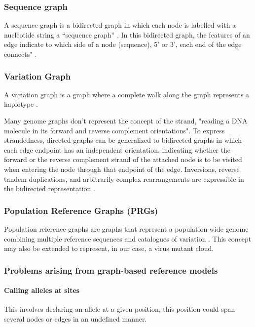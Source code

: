 \documentclass[10pt, a4paper]{article}
\begin{document}
\subsubsection{Sequence graph}
\label{sec:orgb3217bd}
A sequence graph is a bidirected graph in which each node is labelled with a
nucleotide string a “sequence graph” \cite{patenGenomeGraphsEvolution2017}.
In this bidirected graph, the features of an edge indicate to which side of a 
node (sequence), 5’ or 3’, each end of the edge connects" \cite{novakGenomeGraphs2017}.

\subsubsection{Variation Graph}
\label{sec:org0856f6c}
A variation graph is a graph where a complete walk along the graph represents a
haplotype \cite{patenGenomeGraphsEvolution2017}.

Many genome graphs don’t represent the concept of the strand, "reading a DNA
molecule in its forward and reverse complement orientations". To express
strandedness, directed graphs can be generalized to bidirected graphs
\cite{edmondsMatchingWellSolvedClass2003,medvedevComputationalMethodsDiscovering2009}
in which each edge endpoint has an independent orientation, indicating whether 
the forward or the reverse complement strand of the attached node is to be
visited when entering the node through that endpoint of the edge.
Inversions, reverse tandem duplications, and arbitrarily complex rearrangements
are expressible in the bidirected representation
\cite{patenGenomeGraphsEvolution2017}.

\subsubsection{Population Reference Graphs (PRGs)}
\label{sec:org2e7465c}
Population reference graphs are graphs that represent a population-wide genome
combining multiple reference sequences and catalogues of variation
\cite{diltheyImprovedGenomeInference2015}. 
This concept may also be extended to represent, in our case, a virus mutant
cloud.

\subsubsection{Problems arising from graph-based reference models}
\label{sec:org6d0c049}
\paragraph{Calling alleles at sites}
\label{sec:orgfaa0726}
This involves declaring an allele at a given position, this position could span
several nodes or edges in an undefined manner. 
\end{document}
